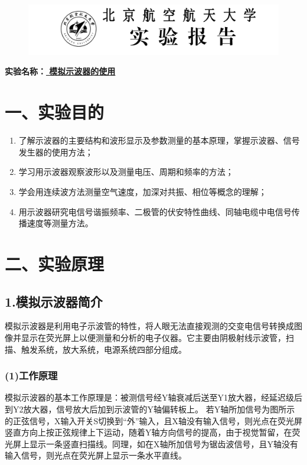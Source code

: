 \documentclass[11pt,a4paper,oneside]{article}
\begin{document}
\begin{figure}[H]
 \centering
  \includegraphics[width=13cm]{Image/表头.png}
\end{figure}
\begin{center}
\textbf{{\large 实验名称：\uline{          模拟示波器的使用     }}}
\end{center}

\section*{一、实验目的}
\begin{enumerate}
\item  了解示波器的主要结构和波形显示及参数测量的基本原理，掌握示波器、信号发生器的使用方法；
\item  学习用示波器观察波形以及测量电压、周期和频率的方法；
\item  学会用连续波方法测量空气速度，加深对共振、相位等概念的理解；
\item 用示波器研究电信号谐振频率、二极管的伏安特性曲线、同轴电缆中电信号传播速度等测量方法。
\end{enumerate}

\section*{二、实验原理}
\subsection*{1.模拟示波器简介}

模拟示波器是利用电子示波管的特性，将人眼无法直接观测的交变电信号转换成图像并显示在荧光屏上以便测量和分析的电子仪器。它主要由阴极射线示波管，扫描、触发系统，放大系统，电源系统四部分组成。

\subsubsection*{(1)工作原理}
模拟示波器的基本工作原理是：被测信号经Y轴衰减后送至Y1放大器，经延迟级后到Y2放大器，信号放大后加到示波管的Y轴偏转板上。
若Y轴所加信号为图所示的正弦信号，X输入开关S切换到“外”输入，且X轴没有输入信号，则光点在荧光屏竖直方向上按正弦规律上下运动，随着Y轴方向信号的提高，由于视觉暂留，在荧光屏上显示一条竖直扫描线。同理，如在X轴所加信号为锯齿波信号，且Y轴没有输入信号，则光点在荧光屏上显示一条水平直线。
\end{document}
